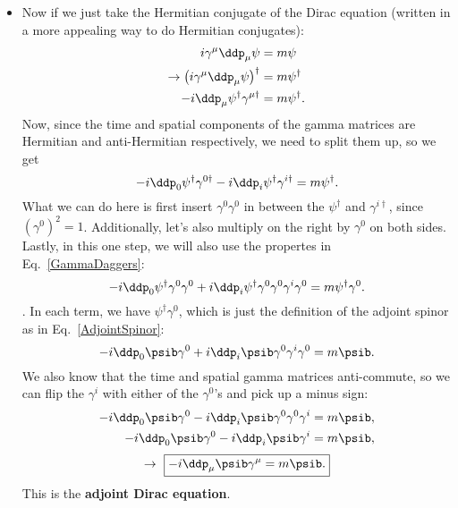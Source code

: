 \begin{itemize}
    \item Now if we just take the Hermitian conjugate of the Dirac equation (written in a more appealing way to do Hermitian conjugates):
        \begin{align*}
            i\gamma^{\mu}\ddp_{\mu}\psi &= m\psi \\ \rightarrow \left(i\gamma^{\mu}\ddp_{\mu}\psi\right)^{\dagger} &= m\psi^{\dagger} \\
            -i \ddp_{\mu}\psi^{\dagger} \gamma^{\mu\dagger} &= m\psi^{\dagger}.
        \end{align*}
        Now, since the time and spatial components of the gamma matrices are Hermitian and anti-Hermitian respectively, we need to split them up, so we get
        \begin{equation*}
            -i \ddp_{0}\psi^{\dagger} \gamma^{0\dagger}  - i \ddp_{i}\psi^{\dagger} \gamma^{i\dagger} = m\psi^{\dagger}.
        \end{equation*}
        What we can do here is first insert $\gamma^0\gamma^0$ in between the $\psi^{\dagger}$ and $\gamma^{i\dagger}$, since $\left(\gamma^0\right)^2=1$. Additionally, let's also multiply on the right by $\gamma^0$ on both sides. Lastly, in this one step, we will also use the propertes in Eq.~\eqref{GammaDaggers}:
        \begin{equation*}
            -i \ddp_{0}\psi^{\dagger} \gamma^0\gamma^0  + i \ddp_{i}\psi^{\dagger}\gamma^0\gamma^0 \gamma^i\gamma^0 = m\psi^{\dagger}\gamma^0.
        \end{equation*}.
        In each term, we have $\psi^{\dagger}\gamma^0$, which is just the definition of the adjoint spinor as in Eq.~\eqref{AdjointSpinor}:
        \begin{equation*}
            -i \ddp_{0}\psib \gamma^0  + i \ddp_{i}\psib \gamma^0 \gamma^i\gamma^0 = m\psib.
        \end{equation*}
        We also know that the time and spatial gamma matrices anti-commute, so we can flip the $\gamma^i$ with either of the $\gamma^0$'s and pick up a minus sign:
        \begin{align*}
            -i \ddp_{0}\psib \gamma^0 - i \ddp_{i}\psib \gamma^0 \gamma^0 \gamma^i &= m\psib, \\
            -i \ddp_{0}\psib \gamma^0 - i \ddp_{i}\psib \gamma^i &= m\psib,
        \end{align*}
        \begin{equation}
            \rightarrow\ \boxed{-i\ddp_{\mu}\psib\gamma^{\mu} = m\psib.}\label{AdjointDiracEQ}
        \end{equation}
        This is the \textbf{adjoint Dirac equation}.


\end{itemize}
